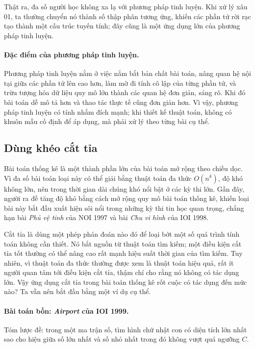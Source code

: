 \documentclass[11pt]{article}
\begin{document}
Thật ra, đa số người học không xa lạ với phương pháp tinh luyện. Khi xử lý
xâu 01, ta thường chuyển nó thành số thập phân tương ứng, khiến các phần tử
rời rạc tạo thành một cấu trúc tuyến tính; đây cũng là một ứng dụng lớn của
phương pháp tinh luyện.

\paragraph{Đặc điểm của phương pháp tinh luyện.}
Phương pháp tinh luyện nằm ở việc nắm bắt bản chất bài toán, nâng quan hệ nội
tại giữa các phần tử lên cao hơn, làm mờ đi tính cô lập của từng phần tử, và
trừu tượng hóa dữ liệu quy mô lớn thành các quan hệ đơn giản, sáng rõ. Khi
đó bài toán dễ mô tả hơn và thao tác thực tế cũng đơn giản hơn. Vì vậy,
phương pháp tinh luyện có tính nhắm đích mạnh; khi thiết kế thuật toán, không
có khuôn mẫu cố định để áp dụng, mà phải xử lý theo từng bài cụ thể.

\subsection{Dùng khéo cắt tỉa}

Bài toán thống kê là một thành phần lớn của bài toán mở rộng theo chiều dọc.
Vì đa số bài toán loại này có thể giải bằng thuật toán đa thức \(O(n^k)\), độ
khó không lớn, nên trong thời gian dài chúng khó nổi bật ở các kỳ thi lớn.
Gần đây, người ra đề tăng độ khó bằng cách mở rộng quy mô bài toán thống kê,
khiến loại bài này bắt đầu xuất hiện sôi nổi trong những kỳ thi tin học quan
trọng, chẳng hạn bài \textit{Phủ vệ tinh} của NOI 1997 và bài
\textit{Chu vi hình} của IOI 1998.

Cắt tỉa là dùng một phép phán đoán nào đó để loại bớt một số quá trình tính
toán không cần thiết. Nó bắt nguồn từ thuật toán tìm kiếm; một điều kiện cắt
tỉa tốt thường có thể nâng cao rất mạnh hiệu suất thời gian của tìm kiếm. Tuy
nhiên, vì thuật toán đa thức thường được xem là thuật toán hiệu quả, rất ít
người quan tâm tới điều kiện cắt tỉa, thậm chí cho rằng nó không có tác dụng
lớn. Vậy ứng dụng cắt tỉa trong bài toán thống kê rốt cuộc có tác dụng đến
mức nào? Ta vẫn nên bắt đầu bằng một ví dụ cụ thể.

\paragraph{Bài toán bốn: \textit{Airport} của IOI 1999.}
Tóm lược đề: trong một ma trận số, tìm hình chữ nhật con có diện tích lớn
nhất sao cho hiệu giữa số lớn nhất và số nhỏ nhất trong đó không vượt quá
ngưỡng \(C\).
\end{document}
